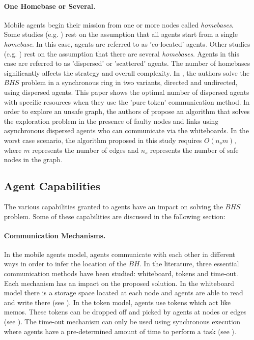 \paragraph{One  Homebase or Several. }
Mobile agents begin their mission from one or more nodes called {\em homebases}. Some studies (e.g. \cite{dobetal8,dobetal3,dobetal7,czyetal1,czyetal2,kosetal15}) rest on the assumption that all agents start from a single {\em homebase}. In this case, agents are referred to as  'co-located' agents. Other studies (e.g. \cite{dobetal7,chaetal12,floetal10,floetal11}) rest on the assumption that there are several {\em homebases}. Agents in this case are referred to as  'dispersed' or 'scattered' agents. The number of homebases significantly affects the strategy and overall complexity. In \cite{chaetal12}, the authors solve the $BHS$ problem in a synchronous ring in two variants, directed and undirected, using dispersed agents. This paper shows the optimal number of dispersed agents with specific resources when they use the 'pure token' communication method. In order to explore an unsafe graph, the authors of \cite{floetal10} propose an algorithm that solves the exploration problem in the presence of faulty nodes and links using asynchronous dispersed agents who can communicate via the whiteboards. In the worst case scenario, the algorithm proposed in this study requires $O(n_sm)$, where $m$ represents the number of edges and $n_s$ represents the number of safe nodes in the graph.



\subsection{ Agent Capabilities}
The various capabilities granted to agents have an impact on  solving the $BHS$ problem. Some of these capabilities are discussed in the following section:
\paragraph{Communication Mechanisms.}
In the mobile agents model, agents communicate with each other in different ways in order to infer the location of the $BH$. In the literature, three essential communication methods have been studied: whiteboard, tokens and time-out. Each mechanism has an impact on the proposed solution. In the whiteboard model there is a storage space located at each node and agents are able to read and write there (see \cite{dobetal7,kosetal15,czyetal2,floetal10}). In the token model, agents use tokens which act like memos. These tokens can be dropped off and picked by agents at nodes or edges (see \cite{chaetal12,floetal9}). The time-out mechanism can only be used using synchronous execution where agents have a pre-determined amount of time to perform a task (see \cite{czyetal1,cooetal15,cooetal14}).

